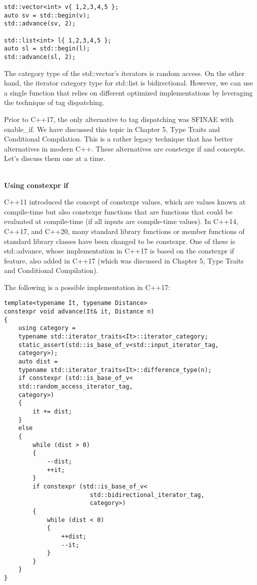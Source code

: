 \begin{lstlisting}[style=styleCXX]
std::vector<int> v{ 1,2,3,4,5 };
auto sv = std::begin(v);
std::advance(sv, 2);

std::list<int> l{ 1,2,3,4,5 };
auto sl = std::begin(l);
std::advance(sl, 2);
\end{lstlisting}

The category type of the std::vector’s iterators is random access. On the other hand, the iterator category type for std::list is bidirectional. However, we can use a single function that relies on different optimized implementations by leveraging the technique of tag dispatching.


Prior to C++17, the only alternative to tag dispatching was SFINAE with enable\_if. We have discussed this topic in Chapter 5, Type Traits and Conditional Compilation. This is a rather legacy technique that has better alternatives in modern C++. These alternatives are constexpr if and concepts. Let’s discuss them one at a time.

\noindent
\hspace*{\fill} \\ %
\textbf{Using constexpr if}

C++11 introduced the concept of constexpr values, which are values known at compile-time but also constexpr functions that are functions that could be evaluated at compile-time (if all inputs are compile-time values). In C++14, C++17, and C++20, many standard library functions or member functions of standard library classes have been changed to be constexpr. One of these is std::advance, whose implementation in C++17 is based on the constexpr if feature, also added in C++17 (which was discussed in Chapter 5, Type Traits and Conditional Compilation).

The following is a possible implementation in C++17:

\begin{lstlisting}[style=styleCXX]
template<typename It, typename Distance>
constexpr void advance(It& it, Distance n)
{
	using category =
	typename std::iterator_traits<It>::iterator_category;
	static_assert(std::is_base_of_v<std::input_iterator_tag,
	category>);
	auto dist =
	typename std::iterator_traits<It>::difference_type(n);
	if constexpr (std::is_base_of_v<
	std::random_access_iterator_tag,
	category>)
	{
		it += dist;
	}
	else
	{
		while (dist > 0)
		{
			--dist;
			++it;
		}
		if constexpr (std::is_base_of_v<
						std::bidirectional_iterator_tag,
						category>)
		{
			while (dist < 0)
			{
				++dist;
				--it;
			}
		}
	}
}
\end{lstlisting}

